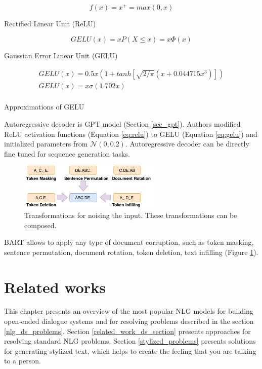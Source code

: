 \begin{eqfloat}
\begin{equation} \label{eq:relu}
f(x) = x^+ = max(0, x)
\end{equation}
\caption{Rectified Linear Unit (ReLU)}
\end{eqfloat}

\begin{eqfloat}
\begin{equation} \label{eq:gelu}
GELU(x) = xP(X \leq x) = x \Phi(x)
\end{equation}
\caption{Gaussian Error Linear Unit (GELU)}
\end{eqfloat}

\begin{eqfloat}
\begin{equation} \label{eq:gelu_approx}
\begin{array}{lcl} 
GELU(x) = 0.5x(1 + tanh[\sqrt{2/\pi}(x + 0.044715x^3)]) \\ 
GELU(x) = x\sigma(1.702x) \\
\end{array}
\end{equation}
\caption{Approximations of GELU}
\end{eqfloat}
Autoregressive decoder is GPT model (Section \ref{sec_gpt}). Authors modified ReLU activation functions (Equation \ref{eq:relu}) to GELU (Equation \ref{eq:gelu}) and initialized parameters from $\mathcal{N}(0, 0.2)$. Autoregressive decoder can be directly fine tuned for sequence generation tasks.

\begin{figure}[hbt]
  \centering
  \includegraphics[width=0.6\textwidth]{figures/bart_doc_corruptions.pdf}
  \caption{Transformations for noising the input. These transformations can be composed.}
  \label{bart_doc_corruption}
\end{figure}

BART allows to apply any type of document corruption, such as token masking, sentence permutation, document rotation, token deletion, text infilling (Figure \ref{bart_doc_corruption}).

\chapter{Related works} \label{related_works}
This chapter presents an overview of the most popular NLG models for building open-ended dialogue systems and for resolving problems described in the section \ref{nlg_ds_problems}. Section \ref{related_work_ds_section} presents approaches for resolving standard NLG problems. Section \ref{stylized_problems} presents solutions for generating stylized text, which helps to create the feeling that you are talking to a person.

